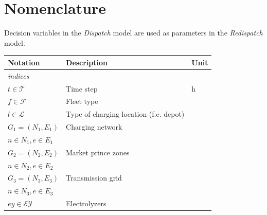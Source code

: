 \documentclass[final,10pt]{elsarticle}
\begin{document}
\section{Nomenclature}\label{sec:Appendix_nomenclature}
Decision variables in the \textit{Dispatch} model are used as parameters in the \textit{Redispatch} model.
% 
\begin{table}[H]
\begin{tabular}{lll}
\textbf{Notation}                              & \textbf{Description}                                   & \textbf{Unit}              \\ \hline
\multicolumn{3}{l}{\textit{indices}}                                                                                                 \\ \hline
$t \in \mathcal{T}$                            & Time step                                              & h                          \\
$f \in \mathcal{F}$                            & Fleet type                                             &                            \\
$l \in \mathcal{L}$                          & Type of charging location (f.e. depot)                 &                            \\
$G_1 = (N_1, E_1)$                             & Charging network                                       &                            \\
$ n \in N_1, e \in E_1$                        &                                                        &                            \\
$G_2 = (N_2, E_2)$                             & Market prince zones                                    &                            \\
$ n \in N_2, e \in E_2$                        &                                                        &                            \\
$G_3 = (N_3, E_3)$                             & Transmission grid                                      &                            \\
$ n \in N_3, e \in E_3$                        &                                                        &                            \\
$ey \in \mathcal{EY}$                        & Electrolyzers                                          &                            \\

\end{tabular}
\end{table}
\end{document}
